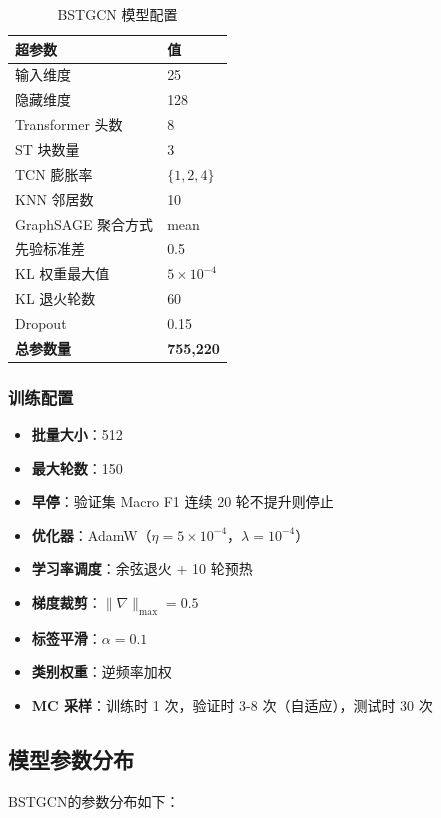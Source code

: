 \begin{table}[h]
\centering
\begin{tabular}{ll}
\hline
\textbf{超参数} & \textbf{值} \\
\hline
输入维度 & 25 \\
隐藏维度 & 128 \\
Transformer 头数 & 8 \\
ST 块数量 & 3 \\
TCN 膨胀率 & $\{1, 2, 4\}$ \\
KNN 邻居数 & 10 \\
GraphSAGE 聚合方式 & mean \\
先验标准差 & 0.5 \\
KL 权重最大值 & $5\times10^{-4}$ \\
KL 退火轮数 & 60 \\
Dropout & 0.15 \\
\hline
\textbf{总参数量} & \textbf{755,220} \\
\hline
\end{tabular}
\caption{BSTGCN 模型配置}
\end{table}

\subsubsection{训练配置}

\begin{itemize}
  \item \textbf{批量大小}：512
  \item \textbf{最大轮数}：150
  \item \textbf{早停}：验证集 Macro F1 连续 20 轮不提升则停止
  \item \textbf{优化器}：AdamW（$\eta=5\times10^{-4}$，$\lambda=10^{-4}$）
  \item \textbf{学习率调度}：余弦退火 + 10 轮预热
  \item \textbf{梯度裁剪}：$\|\nabla\|_{\max}=0.5$
  \item \textbf{标签平滑}：$\alpha=0.1$
  \item \textbf{类别权重}：逆频率加权
  \item \textbf{MC 采样}：训练时 1 次，验证时 3-8 次（自适应），测试时 30 次
\end{itemize}

\subsection{模型参数分布}

BSTGCN的参数分布如下：

